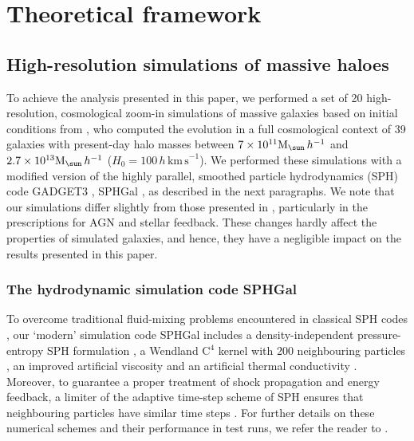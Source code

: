 \documentclass[fleqn,usenatbib]{mnras}
\newcommand{\Msun}{\hbox{M$_\sun$}}
\begin{document}
\section{Theoretical framework}\label{theory} 

\subsection{High-resolution simulations of massive haloes}\label{simulations} 

To achieve the analysis presented in this paper, we performed a set of
20 high-resolution, cosmological zoom-in simulations of massive
galaxies based on initial conditions from \citet{Oser10, Oser12}, who
computed the evolution in a full cosmological context of 39 galaxies
with present-day halo masses between $7\times10^{11}\Msun\,h^{-1}$ and
$2.7\times10^{13}\Msun\,h^{-1}$
($H_0=100\,h\,\mathrm{km\,s}^{-1}$). We performed  these simulations
with a modified version of the highly parallel, smoothed particle
hydrodynamics (SPH) code GADGET3 \citep{Springel05a},  SPHGal
\citep[][see also  \citealt{Choi16,Nunez17}]{Hu14}, as described in
the next paragraphs. We note that our simulations differ slightly 
from those presented in \citet{Choi16}, particularly
in the prescriptions for AGN  and stellar feedback. These changes hardly
affect the properties of simulated galaxies, and hence, they have a 
negligible impact on the results presented in this paper. 

\subsubsection{The hydrodynamic simulation code SPHGal}

To overcome traditional fluid-mixing problems encountered in classical
SPH  codes \citep{Agertz07}, our `modern' simulation code SPHGal
\citep{Hu14} includes a density-independent pressure-entropy SPH
formulation \citep{Ritchie01, Saitoh13, Hopkins13num}, a Wendland
C$^4$ kernel with 200 neighbouring particles \citep{Dehnen12}, an
improved artificial viscosity \citep{Cullen10} and an artificial thermal 
conductivity \citep{Read12}. Moreover, to guarantee a proper treatment 
of shock propagation and energy feedback, a limiter of the adaptive 
time-step scheme of SPH ensures that neighbouring particles have 
similar time steps \citep{Saitoh09,   Durier12}. For further details on 
these numerical schemes and their performance in test runs, we refer 
the reader to \citet{Hu14}. 
\end{document}
